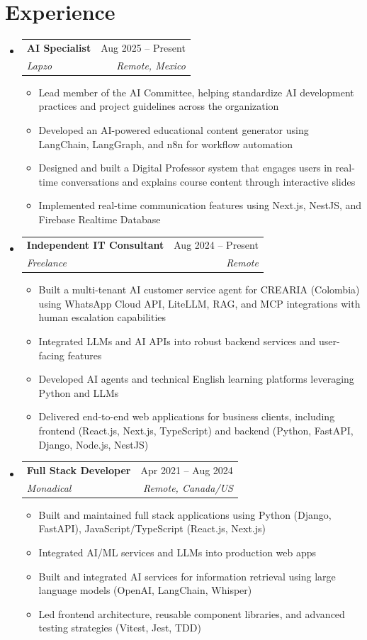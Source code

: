 \documentclass[letterpaper,11pt]{article}
\makeatletter
\newcommand{\resumeSubheading}[4]{
  \vspace{-2pt}
  \item[]
  \begin{tabular*}{\textwidth}{@{\extracolsep{\fill}}l r}
    \textbf{#1} & #2 \\
    \textit{#3} & \textit{#4} \\
  \end{tabular*}
  \vspace{-5pt}
}
\makeatother
\begin{document}
\section{Experience}
\begin{itemize}[leftmargin=0pt, itemindent=0pt, label={}, itemsep=1pt]
\resumeSubheading
{AI Specialist}{Aug 2025 -- Present}
{Lapzo}{Remote, Mexico}
\begin{itemize}[leftmargin=*, itemsep=0pt]
    \item Lead member of the AI Committee, helping standardize AI development practices and project guidelines across the organization
    \item Developed an AI-powered educational content generator using LangChain, LangGraph, and n8n for workflow automation
    \item Designed and built a Digital Professor system that engages users in real-time conversations and explains course content through interactive slides
    \item Implemented real-time communication features using Next.js, NestJS, and Firebase Realtime Database
\end{itemize}

\resumeSubheading
{Independent IT Consultant}{Aug 2024 -- Present}
{Freelance}{Remote}
\begin{itemize}[leftmargin=*, itemsep=0pt]
    \item Built a multi-tenant AI customer service agent for CREARIA (Colombia) using WhatsApp Cloud API, LiteLLM, RAG, and MCP integrations with human escalation capabilities
    \item Integrated LLMs and AI APIs into robust backend services and user-facing features
    \item Developed AI agents and technical English learning platforms leveraging Python and LLMs
    \item Delivered end-to-end web applications for business clients, including frontend (React.js, Next.js, TypeScript) and backend (Python, FastAPI, Django, Node.js, NestJS)
\end{itemize}

\resumeSubheading
{Full Stack Developer}{Apr 2021 -- Aug 2024}
{Monadical}{Remote, Canada/US}
\begin{itemize}[leftmargin=*, itemsep=0pt]
    \item Built and maintained full stack applications using Python (Django, FastAPI), JavaScript/TypeScript (React.js, Next.js)
    \item Integrated AI/ML services and LLMs into production web apps
    \item Built and integrated AI services for information retrieval using large language models (OpenAI, LangChain, Whisper)
    \item Led frontend architecture, reusable component libraries, and advanced testing strategies (Vitest, Jest, TDD)
\end{itemize}


\end{itemize}
\end{document}
